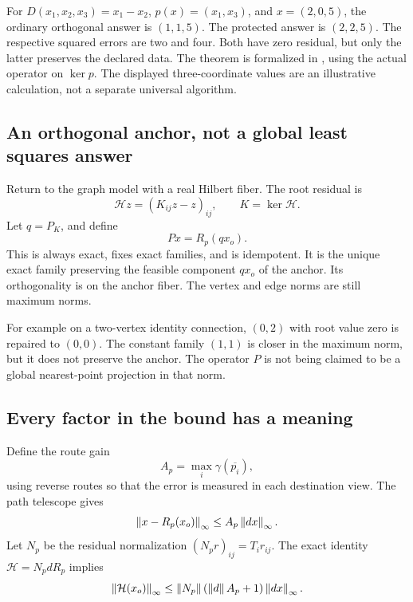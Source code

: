 For \(D(x_1,x_2,x_3)=x_1-x_2\), \(p(x)=(x_1,x_3)\), and \(x=(2,0,5)\), the ordinary orthogonal answer is \((1,1,5)\). The protected answer is \((2,2,5)\). The respective squared errors are two and four. Both have zero residual, but only the latter preserves the declared data. The theorem is formalized in , using the actual operator on \(\ker p\). The displayed three-coordinate values are an illustrative calculation, not a separate universal algorithm.


\label{sec:holonomyrepair}
\subsection{An orthogonal anchor, not a global least squares answer}
Return to the graph model with a real Hilbert fiber. The root residual is
\[
 \mathcal H z=(K_{ij}z-z)_{ij},\qquad K=\ker\mathcal H.
\]
Let \(q=P_K\), and define
\[
 Px=R_p(qx_o).
\]
This is always exact, fixes exact families, and is idempotent. It is the unique exact family preserving the feasible component \(qx_o\) of the anchor. Its orthogonality is on the anchor fiber. The vertex and edge norms are still maximum norms.

For example on a two-vertex identity connection, \((0,2)\) with root value zero is repaired to \((0,0)\). The constant family \((1,1)\) is closer in the maximum norm, but it does not preserve the anchor. The operator \(P\) is not being claimed to be a global nearest-point projection in that norm.

\subsection{Every factor in the bound has a meaning}
Define the route gain
\[
 A_p=\max_i\gamma(\overline{p_i}),
\]
using reverse routes so that the error is measured in each destination view. The path telescope gives
\[
 \left\lVert x-R_p(x_o)\right\rVert_\infty\le A_p\left\lVert dx\right\rVert_\infty.
\]
Let \(N_p\) be the residual normalization \((N_pr)_{ij}=T_ir_{ij}\). The exact identity \(\mathcal H=N_pdR_p\) implies
\[
 \left\lVert\mathcal H(x_o)\right\rVert_\infty
 \le\left\lVert N_p\right\rVert(\left\lVert d\right\rVert A_p+1)\left\lVert dx\right\rVert_\infty.
\]

